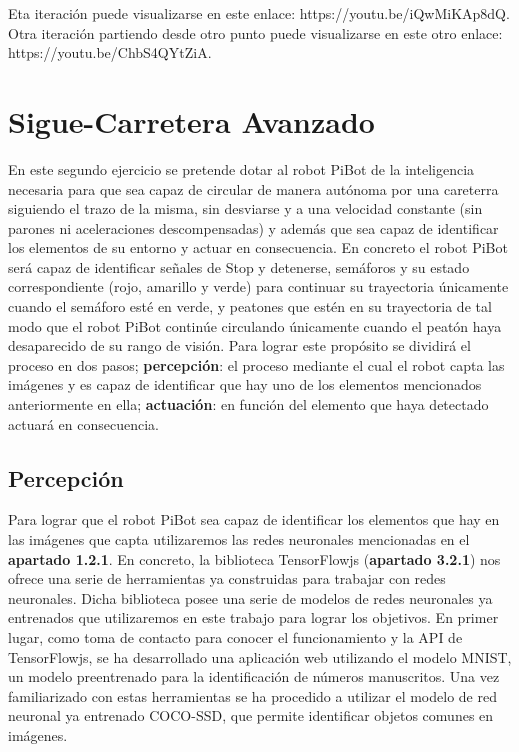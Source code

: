 \documentclass{report}
\begin{document}
Eta iteración puede visualizarse en este enlace: https://youtu.be/iQwMiKAp8dQ. Otra iteración partiendo desde otro punto puede visualizarse en este otro enlace: https://youtu.be/ChbS4QYtZiA.

\newpage
\section{Sigue-Carretera Avanzado}
En este segundo ejercicio se pretende dotar al robot PiBot de la inteligencia necesaria para que sea capaz de circular de manera autónoma por una careterra siguiendo el trazo de la misma, sin desviarse y a una velocidad constante (sin parones ni aceleraciones descompensadas) y además que sea capaz de identificar los elementos de su entorno y actuar en consecuencia. En concreto el robot PiBot será capaz de identificar señales de Stop y detenerse, semáforos y su estado correspondiente (rojo, amarillo y verde) para continuar su trayectoria únicamente cuando el semáforo esté en verde, y peatones que estén en su trayectoria de tal modo que el robot PiBot continúe circulando únicamente cuando el peatón haya desaparecido de su rango de visión. Para lograr este propósito se dividirá el proceso en dos pasos; \textbf{percepción}: el proceso mediante el cual el robot capta las imágenes y es capaz de identificar que hay uno de los elementos mencionados anteriormente en ella; \textbf{actuación}: en función del elemento que haya detectado actuará en consecuencia.


\subsection{Percepción}
Para lograr que el robot PiBot sea capaz de identificar los elementos que hay en las imágenes que capta utilizaremos las redes neuronales mencionadas en el \textbf{apartado 1.2.1}. En concreto, la biblioteca TensorFlowjs (\textbf{apartado 3.2.1}) nos ofrece una serie de herramientas ya construidas para trabajar con redes neuronales. Dicha biblioteca posee una serie de modelos de redes neuronales ya entrenados que utilizaremos en este trabajo para lograr los objetivos. En primer lugar, como toma de contacto para conocer el funcionamiento y la API de TensorFlowjs, se ha desarrollado una aplicación web utilizando el modelo MNIST, un modelo preentrenado para la identificación de números manuscritos. Una vez familiarizado con estas herramientas se ha procedido a utilizar el modelo de red neuronal ya entrenado COCO-SSD, que permite identificar objetos comunes en imágenes. 
\end{document}
